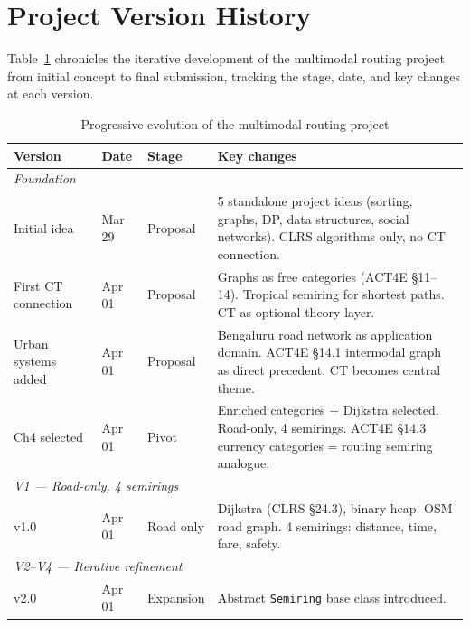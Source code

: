 \documentclass[12pt,a4paper]{article}
\begin{document}
\section{Project Version History}
\label{app:versioning}

Table~\ref{tab:versioning} chronicles the iterative development of the
multimodal routing project from initial concept to final submission,
tracking the stage, date, and key changes at each version.

\begin{table}[H]
\centering
\small
\caption{Progressive evolution of the multimodal routing project}
\label{tab:versioning}
\renewcommand{\arraystretch}{1.4}
\begin{tabularx}{\textwidth}{l l l X}
\toprule
\textbf{Version} & \textbf{Date} & \textbf{Stage} & \textbf{Key changes} \\
\midrule

\multicolumn{4}{l}{\textit{Foundation}} \\[2pt]

Initial idea &
Mar 29 & Proposal &
5 standalone project ideas (sorting, graphs, DP, data structures,
social networks). CLRS algorithms only, no CT connection. \\

First CT connection &
Apr 01 & Proposal &
Graphs as free categories (ACT4E §11--14). Tropical semiring for
shortest paths. CT as optional theory layer. \\

Urban systems added &
Apr 01 & Proposal &
Bengaluru road network as application domain. ACT4E §14.1
intermodal graph as direct precedent. CT becomes central theme. \\

Ch4 selected &
Apr 01 & Pivot &
Enriched categories + Dijkstra selected. Road-only, 4 semirings.
ACT4E §14.3 currency categories = routing semiring analogue. \\

\midrule
\multicolumn{4}{l}{\textit{V1 --- Road-only, 4 semirings}} \\[2pt]

v1.0 & Apr 01 & Road only &
Dijkstra (CLRS §24.3), binary heap. OSM road graph.
4 semirings: distance, time, fare, safety. \\

\midrule
\multicolumn{4}{l}{\textit{V2--V4 --- Iterative refinement}} \\[2pt]

v2.0 & Apr 01 & Expansion &
Abstract \texttt{Semiring} base class introduced. \\


\end{tabularx}
\end{table}
\end{document}
